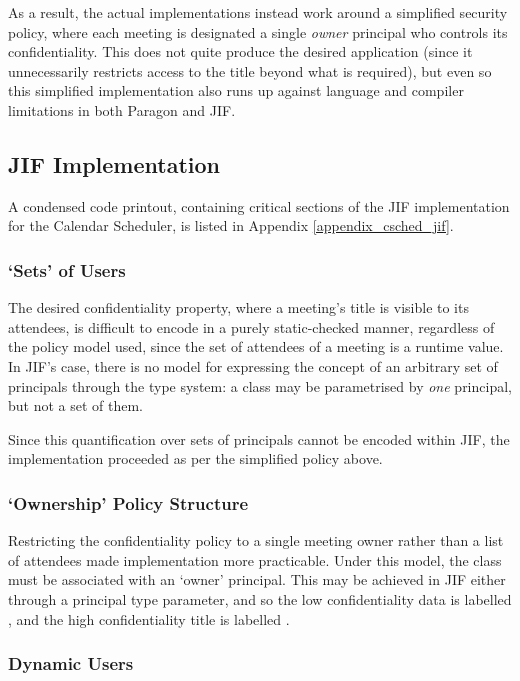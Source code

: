 As a result, the actual implementations instead work around a simplified security policy, where each meeting is designated a single \textit{owner} principal who controls its confidentiality. This does not quite produce the desired application (since it unnecessarily restricts access to the title beyond what is required), but even so this simplified implementation also runs up against language and compiler limitations in both Paragon and JIF.

\subsection{JIF Implementation}

A condensed code printout, containing critical sections of the JIF implementation for the Calendar Scheduler, is listed in Appendix \ref{appendix_csched_jif}.

\subsubsection{`Sets' of Users}

The desired confidentiality property, where a meeting's title is visible to its attendees, is difficult to encode in a purely static-checked manner, regardless of the policy model used, since the set of attendees of a meeting is a runtime value. In JIF's case, there is no model for expressing the concept of an arbitrary set of principals through the type system: a class may be parametrised by \textit{one} principal, but not a set of them.

Since this quantification over sets of principals cannot be encoded within JIF, the implementation proceeded as per the simplified policy above.

\subsubsection{`Ownership' Policy Structure}

Restricting the confidentiality policy to a single meeting owner rather than a list of attendees made implementation more practicable. Under this model, the  class must be associated with an `owner' principal. This may be achieved in JIF either through a principal type parameter, and so the low confidentiality data is labelled , and the high confidentiality title is labelled .

\subsubsection{Dynamic Users}

